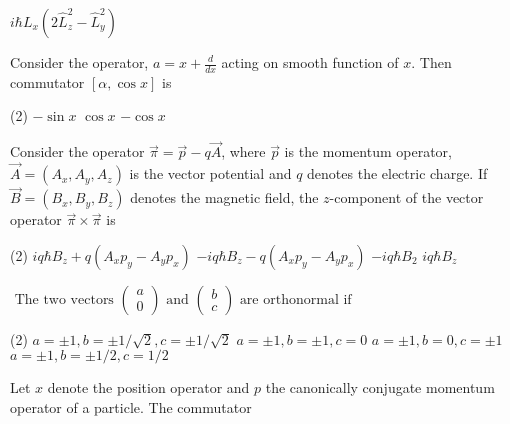 \begin{enumerate}
\begin{tasks}
	\task[\textbf{C.}]$i \hbar L_{x}\left(2 \hat{L}_{z}^{2}-\hat{L}_{y}^{2}\right)$
\end{tasks}
\begin{minipage}{\textwidth}
	\item Consider the operator, $a=x+\frac{d}{d x}$ acting on smooth function of $x$. Then commutator $[\alpha, \cos x]$ is
\end{minipage}
\begin{tasks}(2)
	\task[\textbf{A.}] $-\sin x$
	\task[\textbf{B.}]$\cos x$
	\task[\textbf{C.}]$-\cos x$
\end{tasks}
\begin{minipage}{\textwidth}
	\item Consider the operator $\vec{\pi}=\vec{p}-q \vec{A}$, where $\vec{p}$ is the momentum operator, $\vec{A}=\left(A_{x}, A_{y}, A_{z}\right)$ is the vector potential and $q$ denotes the electric charge. If $\vec{B}=\left(B_{x}, B_{y}, B_{z}\right)$ denotes the magnetic field, the $z$-component of the vector operator $\vec{\pi} \times \vec{\pi}$ is
\end{minipage}
\begin{tasks}(2)
	\task[\textbf{A.}] $i q \hbar B_{z}+q\left(A_{x} p_{y}-A_{y} p_{x}\right)$
	\task[\textbf{B.}]$-i q \hbar B_{z}-q\left(A_{x} p_{y}-A_{y} p_{x}\right)$
	\task[\textbf{C.}]$-i q \hbar B_{2}$
	\task[\textbf{D.}] $i q \hbar B_{z}$
\end{tasks}
\begin{minipage}{\textwidth}
	\item $\text { The two vectors }\left(\begin{array}{l}
	a \\
	0
	\end{array}\right) \text { and }\left(\begin{array}{l}
	b \\
	c
	\end{array}\right) \text { are orthonormal if }$
\end{minipage}
\begin{tasks}(2)
	\task[\textbf{A.}] $a=\pm 1, b=\pm 1 / \sqrt{2}, c=\pm 1 / \sqrt{2}$
	\task[\textbf{B.}] $a=\pm 1, b=\pm 1, c=0$
	\task[\textbf{C.}]$a=\pm 1, b=0, c=\pm 1$
	\task[\textbf{D.}] $a=\pm 1, b=\pm 1 / 2, c=1 / 2$
\end{tasks}
\begin{minipage}{\textwidth}
	\item Let $x$ denote the position operator and $p$ the canonically conjugate momentum operator of a particle. The commutator

\end{minipage}
\end{enumerate}
